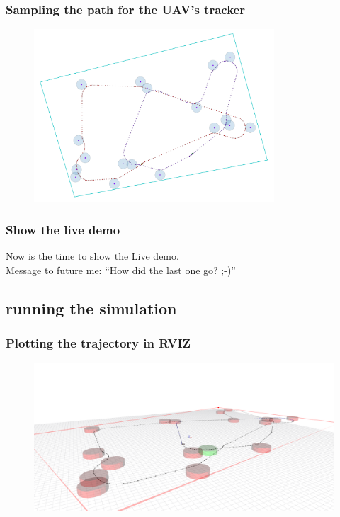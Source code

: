 \documentclass[aspectratio=1610]{beamer}
\begin{document}
\begin{frame}
  \frametitle{Sampling the path for the UAV's tracker}

  \begin{figure}
    \includegraphics[width=0.8\textwidth]{./fig/tsp_dubins_sampled.png}
  \end{figure}

\end{frame}

\begin{frame}
  \frametitle{Show the live demo}

  \begin{center}
    \large Now is the time to show the Live demo.\\
    \vspace{2em}
    Message to future me: ``How did the last one go? ;-)''
  \end{center}

\end{frame}

\subsection{running the simulation}

\begin{frame}
  \frametitle{Plotting the trajectory in RVIZ}

  \begin{figure}
    \includegraphics[width=1.0\textwidth]{./fig/rviz_1.png}
  \end{figure}

\end{frame}
\end{document}
